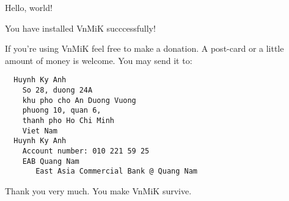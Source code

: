 \documentclass{article}
\begin{document}
Hello, world!

\bigskip

You have installed VnMiK succcessfully!

\bigskip

If you're using VnMiK feel free to make a donation.
A post-card or a little amount of money is welcome.
You may send it to:

\begin{verbatim}
  Huynh Ky Anh
    So 28, duong 24A
    khu pho cho An Duong Vuong
    phuong 10, quan 6,
    thanh pho Ho Chi Minh
    Viet Nam
  Huynh Ky Anh
    Account number: 010 221 59 25
    EAB Quang Nam
       East Asia Commercial Bank @ Quang Nam
\end{verbatim}

Thank you very much. You make VnMiK survive.

\bigskip
{}
\end{document}

